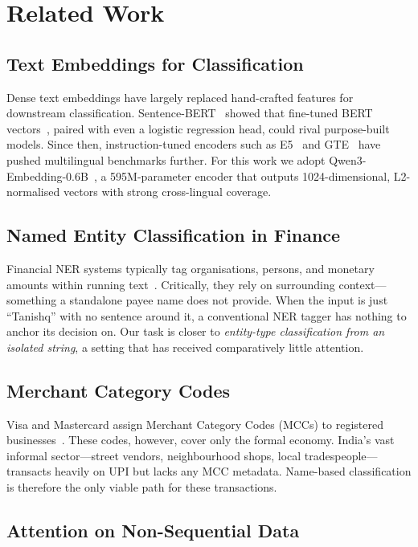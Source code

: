 \documentclass[conference]{IEEEtran}
\begin{document}
\section{Related Work}
\label{sec:related}

\subsection{Text Embeddings for Classification}

Dense text embeddings have largely replaced hand-crafted features for downstream classification. Sentence-BERT~\cite{reimers2019sentence} showed that fine-tuned BERT vectors~\cite{devlin2019bert}, paired with even a logistic regression head, could rival purpose-built models. Since then, instruction-tuned encoders such as E5~\cite{wang2024e5} and GTE~\cite{li2023gte} have pushed multilingual benchmarks further. For this work we adopt Qwen3-Embedding-0.6B~\cite{qwen3}, a 595M-parameter encoder that outputs 1024-dimensional, L2-normalised vectors with strong cross-lingual coverage.

\subsection{Named Entity Classification in Finance}

Financial NER systems typically tag organisations, persons, and monetary amounts within running text~\cite{salinas2023finNER}. Critically, they rely on surrounding context---something a standalone payee name does not provide. When the input is just ``Tanishq'' with no sentence around it, a conventional NER tagger has nothing to anchor its decision on. Our task is closer to \emph{entity-type classification from an isolated string}, a setting that has received comparatively little attention.

\subsection{Merchant Category Codes}

Visa and Mastercard assign Merchant Category Codes (MCCs) to registered businesses~\cite{visa_mcc}. These codes, however, cover only the formal economy. India's vast informal sector---street vendors, neighbourhood shops, local tradespeople---transacts heavily on UPI but lacks any MCC metadata. Name-based classification is therefore the only viable path for these transactions.

\subsection{Attention on Non-Sequential Data}
\end{document}
